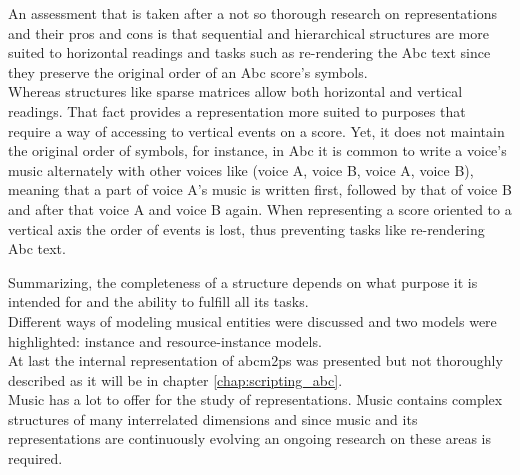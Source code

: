 \documentclass[main.tex]{files}
\begin{document}
An assessment that is taken after a not so thorough research on representations and their pros and
cons is that sequential and hierarchical structures are more suited to horizontal readings and tasks
such as re-rendering the Abc text since they preserve the original order of an Abc score's
symbols.\\
Whereas structures like sparse matrices allow both horizontal and vertical readings. That fact
provides a representation more suited to purposes that require a way of accessing to vertical events
on a score. Yet, it does not maintain the original order of symbols, for instance, in Abc it is
common to write a voice's music alternately with other voices like (voice A, voice B, voice A, voice B),
meaning that a part of voice A's music is written first, followed by that of voice B and after that
voice A and voice B again. When representing a score oriented to a vertical axis the order of events
is lost, thus preventing tasks like re-rendering Abc text.

Summarizing, the completeness of a structure depends on what purpose it is intended for and the
ability to fulfill all its tasks.\\

Different ways of modeling musical entities were discussed and two models were highlighted:
instance and resource-instance models.\\

At last the internal representation of abcm2ps was presented but not thoroughly described as it
will be in chapter \ref{chap:scripting_abc}.\\

Music has a lot to offer for the study of representations. Music contains complex structures of many
interrelated dimensions and since music and its representations are continuously evolving an ongoing
research on these areas is required.
\end{document}
